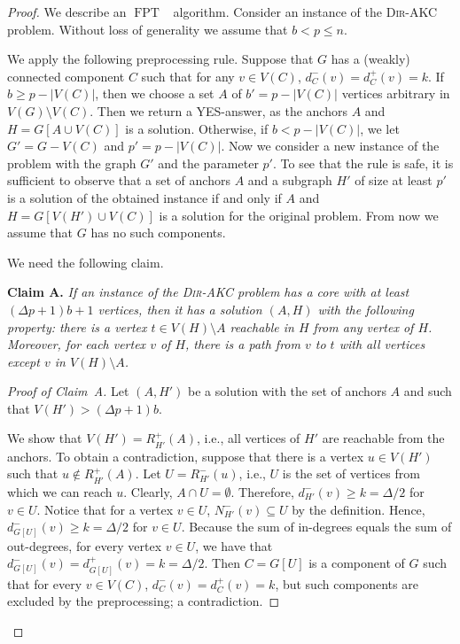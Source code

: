 \documentclass[11pt,a4paper]{article}
\DeclareMathOperator{\operatorClassFPT}{FPT}
\newcommand{\classFPT}{\ensuremath{\operatorClassFPT}}
\newcommand{\DAKC}{\textsc{Dir-AKC}\xspace}
\begin{document}
\begin{proof}
We describe an \classFPT~ algorithm. Consider an instance of the \DAKC problem. Without loss of generality we assume that $b<p\leq n$.

We apply the following preprocessing rule. Suppose that $G$ has a (weakly) connected component $C$ such that for any $v\in
V(C)$, $d_C^-(v)=d_C^+(v)=k$. If $b\geq p-|V(C)|$, then we choose a set $A$ of $b'=p-|V(C)|$ vertices arbitrary in
$V(G)\setminus V(C)$. Then we return a YES-answer, as the anchors $A$ and $H=G[A\cup V(C)]$ is a solution. Otherwise, if $b<
p-|V(C)|$, we let $G'=G-V(C)$ and $p'=p-|V(C)|$. Now we consider a new instance of the problem with the graph $G'$ and the
parameter $p'$. To see that the rule is safe, it is sufficient to observe that a set of anchors $A$ and a subgraph $H'$ of
size at least $p'$ is a solution of the obtained instance if and only if $A$ and $H=G[V(H')\cup V(C)]$ is a solution for the
original problem. From now we assume that $G$ has no such components.

\medskip

We need the following claim.

\medskip
\noindent
{\bf Claim A.} {\it
If an instance of the \DAKC problem has a core with at least $(\Delta p+1)b+1$ vertices, then it has a solution
$(A,H)$ with the following property: there is a vertex $t\in V(H)\setminus A$  reachable in $H$ from any vertex of $H$.
Moreover, for each vertex $v$ of $H$, there is a path from $v$ to $t$ with all vertices except $v$ in  $ V(H)\setminus A$.
}



\begin{proof}[Proof of Claim~A]
Let  $(A,H')$ be a solution with the set of anchors $A$ and such that $V(H')> (\Delta p+1)b$.

We show that $V(H')=R_{H'}^+(A)$, i.e., all vertices of $H'$ are reachable from the anchors. To obtain a contradiction,
suppose that there is a vertex $u\in V(H')$ such that $u\notin R_{H'}^+(A)$. Let $U=R_{H'}^-(u)$, i.e., $U$ is the set of
vertices from which we can reach $u$. Clearly, $A\cap U=\emptyset$. Therefore, $d_{H'}^-(v)\geq k=\Delta/2$ for $v\in U$.
Notice that for a vertex $v\in U$, $N_{H'}^{-}(v)\subseteq U$ by the definition. Hence, $d_{G[U]}^-(v)\geq k=\Delta/2$ for $v\in
U$. Because the sum of in-degrees equals the sum of out-degrees, for  every vertex $v\in U$, we have that
$d_{G[U]}^-(v)=d_{G[U]}^+(v)=k=\Delta/2$. Then $C=G[U]$ is a component of $G$ such that for every $v\in V(C)$,
$d_C^-(v)=d_C^+(v)=k$, but such components are excluded by the preprocessing; a contradiction.


\end{proof}
\end{proof}
\end{document}
